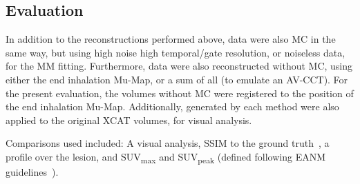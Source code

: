     
    \subsection{Evaluation} \label{sec:evaluation}
        In addition to the reconstructions performed %
        above, data were also \gls{MC} in the same way, %
        but using high noise high temporal/gate resolution, or noiseless data, for the \gls{MM} fitting. Furthermore, data were also reconstructed without \gls{MC}, using either the end inhalation \gls{Mu-Map}, or a sum of all  (to emulate an \gls{AV-CCT}). For the present evaluation, the volumes without \gls{MC} were registered to the position of the end inhalation \gls{Mu-Map}. Additionally,  generated by each method were also applied to the original \acrshort{XCAT} volumes, for visual analysis.
        
        Comparisons used included: A visual analysis, \acrshort{SSIM} to the ground truth~\cite{Wang2009MeanMeasures}, a profile over the lesion, and \acrshort{SUV}\textsubscript{max} and \acrshort{SUV}\textsubscript{peak} (defined following \acrshort{EANM} guidelines~\cite{Boellaard2015FDG2.0}).


